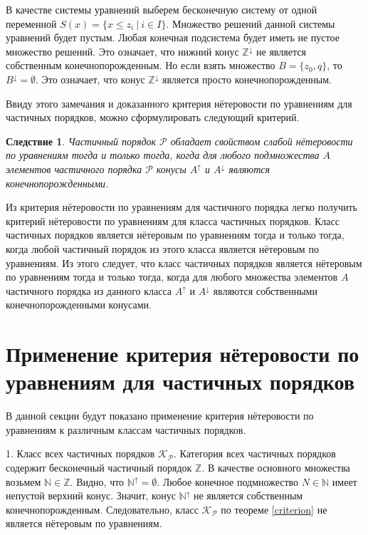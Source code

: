 \documentclass[12pt]{article}
\theoremstyle{break}
\newtheorem{Con}{Следствие}
\def\P{\mathcal{P}}
\begin{document}
		В качестве системы уравнений выберем бесконечную систему от одной переменной $S(x) = \{x\leqslant z_i\ |\ i\in I\}.$ Множество решений данной системы уравнений будет пустым. Любая конечная подсистема будет иметь не пустое множество решений. Это означает, что нижний конус $\mathbb{Z}^{\downarrow}$ не является собственным конечнопорожденным. Но если взять множество $B = \{z_0, q\}$, то $B^{\downarrow} = \emptyset$. Это означает, что конус $\mathbb{Z}^{\downarrow}$ является просто конечнопорожденным.

		Ввиду этого замечания и доказанного критерия нётеровости по уравнениям для частичных порядков, можно сформулировать следующий критерий.

		\begin{Con}
			Частичный порядок $\P$ обладает свойством слабой нётеровости по уравнениям тогда и только тогда, когда для любого подмножества $A$ элементов частичного порядка $\P$ конусы $A^{\uparrow}$ и $A^{\downarrow}$ являются конечнопорожденными.
		\end{Con}

		Из критерия нётеровости по уравнениям для частичного порядка легко получить критерий нётеровости по уравнениям для класса частичных порядков. Класс частичных порядков является нётеровым по уравнениям тогда и только тогда, когда любой частичный порядок из этого класса является нётеровым по уравнениям. Из этого следует, что класс частичных порядков является нётеровым по уравнениям тогда и только тогда, когда для любого множества элементов $A$ частичного порядка из данного класса $A^{\uparrow}$ и $A^{\downarrow}$ являются собственными конечнопорожденными конусами.


	\section{Применение критерия нётеровости по уравнениям для частичных порядков}
		В данной секции будут показано применение критерия нётеровости по уравнениям к различным классам частичных порядков.

		1. Класс всех частичных порядков $\mathcal{K}_{\P}.$ Категория всех частичных порядков содержит бесконечный частичный порядок $\mathbb{Z}$. В качестве основного множества возьмем $\mathbb{N}\in\mathbb{Z}$. Видно, что $\mathbb{N}^{\uparrow} = \emptyset$. Любое конечное подмножество $N\in\mathbb{N}$ имеет непустой верхний конус. Значит, конус $\mathbb{N}^{\uparrow}$ не является собственным конечнопорожденным. Следовательно, класс $\mathcal{K}_{\P}$ по теореме \ref{criterion} не является нётеровым по уравнениям.
\end{document}
